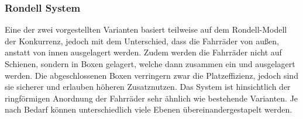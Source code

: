 ﻿\subsubsection{Rondell System}

Eine der zwei vorgestellten Varianten basiert teilweise auf dem Rondell-Modell der Konkurrenz, jedoch mit dem Unterschied, dass die Fahrräder von außen, anstatt von innen ausgelagert werden. Zudem werden die Fahrräder nicht auf Schienen, sondern in Boxen gelagert, welche dann zusammen ein und ausgelagert werden. Die abgeschlossenen Boxen verringern zwar die Platzeffizienz, jedoch sind sie sicherer und erlauben höheren Zusatznutzen. Das System ist hinsichtlich der ringförmigen Anordnung der Fahrräder sehr ähnlich wie bestehende Varianten. Je nach Bedarf können unterschiedlich viele Ebenen übereinandergestapelt werden.

